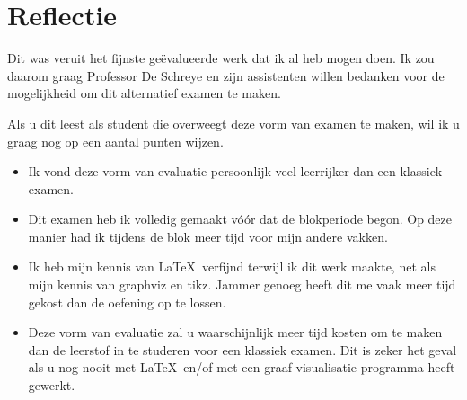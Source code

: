 \documentclass[alternative-exam.tex]{subfiles}
\begin{document}
\chapter*{Reflectie}
Dit was veruit het fijnste ge\"evalueerde werk dat ik al heb mogen doen. Ik zou daarom graag Professor De Schreye en zijn assistenten willen bedanken voor de mogelijkheid om dit alternatief examen te maken.

\noindent Als u dit leest als student die overweegt deze vorm van examen te maken, wil ik u graag nog op een aantal punten wijzen.
\begin{itemize}
\item Ik vond deze vorm van evaluatie persoonlijk veel leerrijker dan een klassiek examen.
\item Dit examen heb ik volledig gemaakt v\'o\'or dat de blokperiode begon. Op deze manier had ik tijdens de blok meer tijd voor mijn andere vakken.
\item Ik heb mijn kennis van \LaTeX\ verfijnd terwijl ik dit werk maakte, net als mijn kennis van graphviz en tikz. Jammer genoeg heeft dit me vaak meer tijd gekost dan de oefening op te lossen.
\item Deze vorm van evaluatie zal u waarschijnlijk meer tijd kosten om te maken dan de leerstof in te studeren voor een klassiek examen. Dit is zeker het geval als u nog nooit met \LaTeX\ en/of met een graaf-visualisatie programma heeft gewerkt.
\end{itemize}
\end{document}
